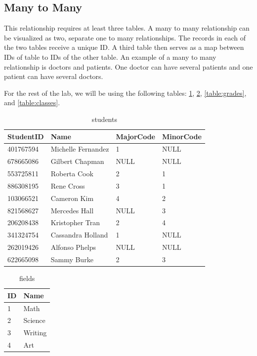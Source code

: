 \subsection*{Many to Many}
This relationship requires at least three tables.
A many to many relationship can be visualized as two, separate one to many relationships.
The records in each of the two tables receive a unique ID.
A third table then serves as a map between IDs of table to IDs of the other table.
An example of a many to many relationship is doctors and patients.
One doctor can have several patients and one patient can have several doctors.

For the rest of the lab, we will be using the following tables: \ref{table:students}, \ref{table:majors}, \ref{table:grades}, and \ref{table:classes}.

\begin{table}
\begin{tabular}{|l|l|l|l|}
\hline
StudentID & Name & MajorCode & MinorCode \\
\hline
401767594 & Michelle Fernandez & 1 & NULL \\
678665086 & Gilbert Chapman & NULL & NULL\\
553725811 & Roberta Cook & 2 & 1\\
886308195 & Rene Cross & 3 & 1\\
103066521 & Cameron Kim & 4 & 2\\
821568627 & Mercedes Hall & NULL & 3 \\
206208438 & Kristopher Tran & 2 & 4\\
341324754 & Cassandra Holland & 1 & NULL\\
262019426 & Alfonso Phelps & NULL & NULL\\
622665098 & Sammy Burke & 2 & 3 \\
\hline
\end{tabular}
\caption{students}
\label{table:students}
\end{table}

\begin{table}
\begin{tabular}{|l|l|}
\hline
ID & Name \\
\hline
1 & Math \\
2 & Science \\
3 & Writing \\
4 & Art \\
\hline
\end{tabular}
\caption{fields}
\label{table:majors}
\end{table}

